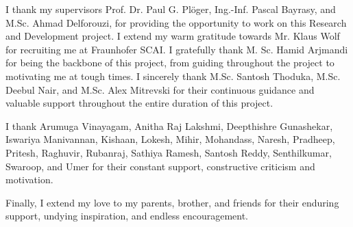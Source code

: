 \documentclass[rnd]{mas_report}
\begin{document}
\begin{acknowledgements}
I thank my supervisors Prof. Dr. Paul G. Pl\"oger, Ing.-Inf. Pascal Bayrasy, and M.Sc. Ahmad Delforouzi, for providing the opportunity to work on this Research and Development project. I extend my warm gratitude towards Mr. Klaus Wolf for recruiting me at Fraunhofer SCAI. I gratefully thank M. Sc. Hamid Arjmandi for being the backbone of this project, from guiding throughout the project to motivating me at tough times. I sincerely thank M.Sc. Santosh Thoduka, M.Sc. Deebul Nair, and M.Sc. Alex Mitrevski for their continuous guidance and valuable support throughout the entire duration of this project.

I thank Arumuga Vinayagam, Anitha Raj Lakshmi, Deepthishre Gunashekar, Iswariya Manivannan, Kishaan, Lokesh, Mihir, Mohandass, Naresh, Pradheep, Pritesh, Raghuvir, Rubanraj, Sathiya Ramesh, Santosh Reddy, Senthilkumar, Swaroop, and Umer for their constant support, constructive criticism and motivation.

Finally, I extend my love to my parents, brother, and friends for their enduring support, undying inspiration, and endless encouragement.
\end{acknowledgements}

\tableofcontents
\chapter*{\glossaryname}
\markboth{\glossaryname}{}
\renewcommand{\glossarysection}[2][]{}
\printglossary[type=\acronymtype, nonumberlist]
\listoffigures
\listoftables

\mainmatter %

\pagestyle{mainmatter}









\begin{appendices}

\end{appendices}

\backmatter

 
 
\end{document}
